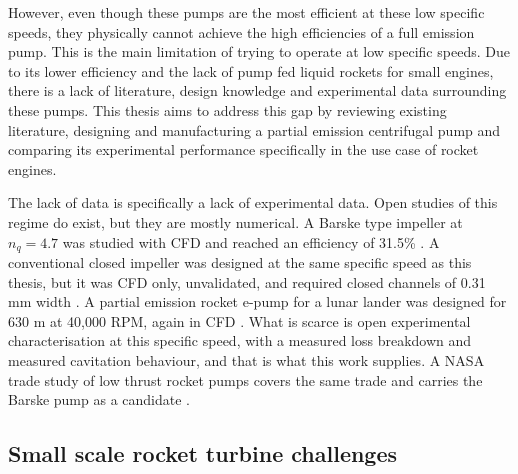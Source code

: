 However, even though these pumps are the most efficient at these low specific speeds, they physically cannot achieve the high efficiencies of a full emission pump. This is the main limitation of trying to operate at low specific speeds. Due to its lower efficiency and the lack of pump fed liquid rockets for small engines, there is a lack of literature, design knowledge and experimental data surrounding these pumps. This thesis aims to address this gap by reviewing existing literature, designing and manufacturing a partial emission centrifugal pump and comparing its experimental performance specifically in the use case of rocket engines.

The lack of data is specifically a lack of experimental data. Open studies of this regime do exist, but they are mostly numerical. A Barske type impeller at $n_q = 4.7$ was studied with CFD and reached an efficiency of 31.5\% \cite{knyazevaDesignFluidDynamics2021}. A conventional closed impeller was designed at the same specific speed as this thesis, but it was CFD only, unvalidated, and required closed channels of 0.31 mm width \cite{kimDevelopmentUltraLowSpecific2022}. A partial emission rocket e-pump for a lunar lander was designed for 630 m at 40,000 RPM, again in CFD \cite{danieliConceptualDesignElectric2023}. What is scarce is open experimental characterisation at this specific speed, with a measured loss breakdown and measured cavitation behaviour, and that is what this work supplies. A NASA trade study of low thrust rocket pumps covers the same trade and carries the Barske pump as a candidate \cite{macgregorRotatingPositivedisplacementPumps1974}.


\subsection{Small scale rocket turbine challenges}

